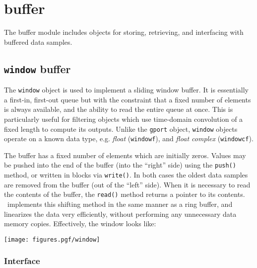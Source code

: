 % 
%

\newpage
\section{buffer}
\label{module:buffer}
The buffer module includes objects for storing, retrieving, and interfacing
with buffered data samples.


\subsection{{\tt window} buffer}
\label{module:buffer:window}
The {\tt window} object is used to implement a sliding window buffer.
It is essentially a first-in, first-out queue but with the constraint that a
fixed number of elements is always available, and the ability to read the
entire queue at once.
This is particularly useful for filtering objects which use time-domain
convolution of a fixed length to compute its outputs.
Unlike the {\tt gport} object, {\tt window} objects operate on a known data
type, e.g.
{\it float} ({\tt windowf}), and
{\it float complex} ({\tt windowcf}).

The buffer has a fixed number of elements which are initially zeros.
Values may be pushed into the end of the buffer (into the ``right'' side)
using the {\tt push()} method, or written in blocks via {\tt write()}.
In both cases the oldest data samples are removed from the buffer (out of the
``left'' side).
When it is necessary to read the contents of the buffer, the {\tt read()}
method returns a pointer to its contents.
\liquid\ implements this shifting method in the same manner as a ring buffer,
and linearizes the data very efficiently, without performing any unnecessary
data memory copies.
Effectively, the window looks like:

\begin{centering}
\texttt{[image: figures.pgf/window]}
\end{centering}

\subsubsection{Interface}
\label{module:buffer:window:interface}

